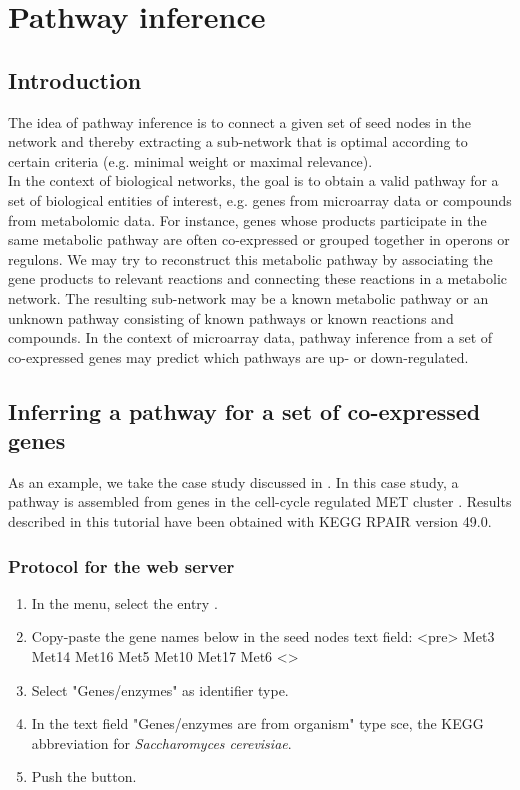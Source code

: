\chapter{Pathway inference}

\section{Introduction}
The idea of pathway inference is to connect a given set of seed nodes
in the network and thereby extracting a sub-network that is optimal
according to certain criteria (e.g. minimal weight or maximal relevance).\\
In the context of biological networks, the goal is to obtain a valid pathway for a set
of biological entities of interest, e.g. genes from microarray data or compounds from metabolomic data.
For instance, genes whose products participate in the same metabolic pathway are often co-expressed or grouped
together in operons or regulons. We may try to reconstruct this metabolic pathway by associating
the gene products to relevant reactions and connecting these reactions in a metabolic network.
The resulting sub-network may be a known metabolic pathway or an unknown pathway consisting of known
pathways or known reactions and compounds. In the context of microarray data, pathway inference from a
set of co-expressed genes may predict which pathways are up- or down-regulated.\\

\section{Inferring a pathway for a set of co-expressed genes}

As an example, we take the case study discussed in \cite{vanHelden01}.
In this case study, a pathway is assembled from genes in the cell-cycle regulated MET cluster \cite{Spellman98}.
Results described in this tutorial have been obtained with KEGG RPAIR version 49.0.

\subsection{Protocol for the web server}

\begin{enumerate}

\item In the \neat  menu, select the entry .

\item Copy-paste the gene names below in the seed nodes text field:
<pre>
Met3
Met14
Met16
Met5
Met10
Met17
Met6
<\pre>

\item Select "Genes/enzymes" as identifier type.

\item In the text field "Genes/enzymes are from organism" type sce, the KEGG abbreviation for \textit{Saccharomyces cerevisiae}.

\item Push the  button.

\end{enumerate}

